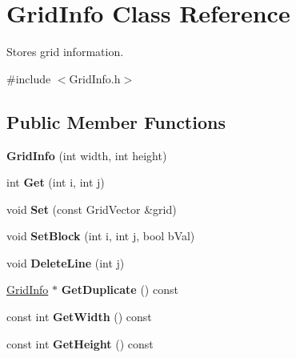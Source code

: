 \hypertarget{classGridInfo}{\section{Grid\-Info Class Reference}
\label{classGridInfo}
}


Stores grid information.  




{\ttfamily \#include $<$Grid\-Info.\-h$>$}

\subsection*{Public Member Functions}
\begin{DoxyCompactItemize}
\item 
\hypertarget{classGridInfo_ae4c384ef11929d6948947f95bc2a7564}{{\bfseries Grid\-Info} (int width, int height)}\label{classGridInfo_ae4c384ef11929d6948947f95bc2a7564}

\item 
\hypertarget{classGridInfo_a4c234f6a323899ee9b8ba1a6626503b8}{int {\bfseries Get} (int i, int j)}\label{classGridInfo_a4c234f6a323899ee9b8ba1a6626503b8}

\item 
\hypertarget{classGridInfo_a92ac092198c004a52f82453aa9de41e2}{void {\bfseries Set} (const Grid\-Vector \&grid)}\label{classGridInfo_a92ac092198c004a52f82453aa9de41e2}

\item 
\hypertarget{classGridInfo_a98d546bdbd86f0fb370a9ad6e2e6f7ba}{void {\bfseries Set\-Block} (int i, int j, bool b\-Val)}\label{classGridInfo_a98d546bdbd86f0fb370a9ad6e2e6f7ba}

\item 
\hypertarget{classGridInfo_a4fce4bc06b674480f875cff8a476685e}{void {\bfseries Delete\-Line} (int j)}\label{classGridInfo_a4fce4bc06b674480f875cff8a476685e}

\item 
\hypertarget{classGridInfo_a75d1dc744ab71ba45ad3a987dbe5c2bc}{\hyperlink{classGridInfo}{Grid\-Info} $\ast$ {\bfseries Get\-Duplicate} () const }\label{classGridInfo_a75d1dc744ab71ba45ad3a987dbe5c2bc}

\item 
\hypertarget{classGridInfo_a988e66e9681addb8702802b185bbf833}{const int {\bfseries Get\-Width} () const }\label{classGridInfo_a988e66e9681addb8702802b185bbf833}

\item 
\hypertarget{classGridInfo_a472370b1d4d8035e5db639a934b7e41b}{const int {\bfseries Get\-Height} () const }\label{classGridInfo_a472370b1d4d8035e5db639a934b7e41b}

\end{DoxyCompactItemize}



